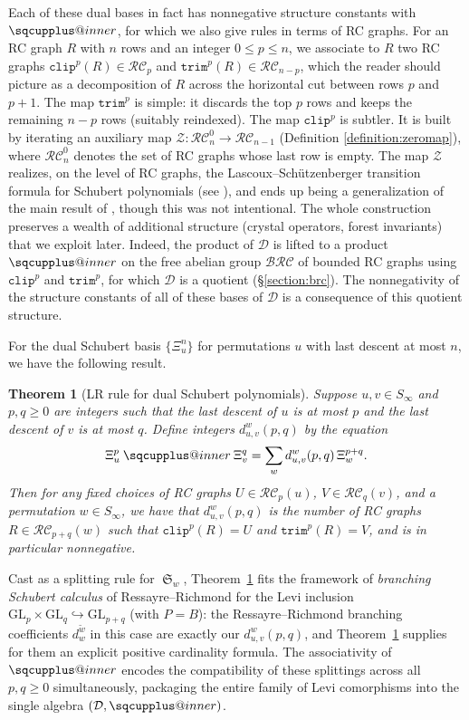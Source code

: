 \documentclass{amsart}
\makeatletter
\newcommand{\sqcupplus@inner}[2]{%
  \vcenter{\hbox{\ooalign{%
    \hfil$\m@th#1\sqcup$\hfil\cr
    \hfil\raisebox{0.15ex}{$\m@th#1\scriptscriptstyle+$}\hfil\cr
  }}}%
}
\newcommand{\sqcupplus}{\mathbin{\mathpalette\sqcupplus@inner\relax}}
\newtheorem{theorem}{Theorem}[section]
\theoremstyle{definition}
\theoremstyle{remark}
\numberwithin{equation}{subsection}
\DeclareMathOperator{\sch}{\mathfrak{S}}
\newcommand{\trm}{\mathtt{trim}}
\newcommand{\zeromap}{\mathcal{Z}}
\newcommand{\clp}{\mathtt{clip}}
\newcommand{\BRC}{\mathcal{BRC}}
\newcommand{\RC}{\mathcal{RC}}
\newcommand{\dsch}{\ensuremath{\Xi}}
\newcommand{\dcoma}{\mathcal{D}}
\makeatother
\begin{document}
Each of these dual bases in fact has nonnegative structure constants with $\sqcupplus$, for which we also give rules in terms of RC graphs. For an RC graph $R$ with $n$ rows and an integer $0\leq p\leq n$, we associate to $R$ two RC graphs $\clp^p(R)\in\RC_p$ and $\trm^p(R)\in\RC_{n-p}$, which the reader should picture as a decomposition of $R$ across the horizontal cut between rows $p$ and $p+1$. The map $\trm^p$ is simple: it discards the top $p$ rows and keeps the remaining $n-p$ rows (suitably reindexed). The map $\clp^p$ is subtler. It is built by iterating an auxiliary map $\zeromap:\RC_n^0\to\RC_{n-1}$ (Definition \ref{definition:zeromap}), where $\RC_n^0$ denotes the set of RC graphs whose last row is empty. The map $\zeromap$ realizes, on the level of RC graphs, the Lascoux--Schützenberger transition formula for Schubert polynomials (see \cite{notes}), and ends up being a generalization of the main result of \cite{little2003combinatorial}, though this was not intentional. The whole construction preserves a wealth of additional structure (crystal operators, forest invariants) that we exploit later. Indeed, the product of $\dcoma$ is lifted to a product $\sqcupplus$ on the free abelian group $\BRC$ of bounded RC graphs using $\clp^p$ and $\trm^p$, for which $\dcoma$ is a quotient (\S\ref{section:brc}). The nonnegativity of the structure constants of all of these bases of $\dcoma$ is a consequence of this quotient structure.

For the dual Schubert basis $\{\dsch_u^n\}$ for permutations $u$ with last descent at most $n$, we have the following result.

\begin{theorem}[LR rule for dual Schubert polynomials]\label{theorem:LR}
Suppose $u,v\in S_\infty$ and $p,q\geq 0$ are integers such that the last descent of $u$ is at most $p$ and the last descent of $v$ is at most $q$. Define integers $d_{u,v}^w(p, q)$ by the equation
$$\dsch_u^p \sqcupplus \dsch_v^q = \sum_{w} d_{u,v}^w(p, q)\,\dsch_w^{p+q}.$$
Then for any fixed choices of RC graphs $U\in \RC_p(u)$, $V\in\RC_q(v)$, and a permutation $w\in S_\infty$, we have that $d_{u, v}^w(p, q)$ is the number of RC graphs $R\in \RC_{p+q}(w)$ such that $\clp^p(R)=U$ and $\trm^p(R)=V$, and is in particular nonnegative.
\end{theorem}
Cast as a splitting rule for $\sch_w$, Theorem~\ref{theorem:LR} fits the framework of \emph{branching Schubert calculus} of Ressayre--Richmond \cite{ressayre2009branching} for the Levi inclusion $\mathrm{GL}_p\times \mathrm{GL}_q\hookrightarrow \mathrm{GL}_{p+q}$ (with $P=B$): the Ressayre--Richmond branching coefficients $d_w^{\tilde w}$ in this case are exactly our $d_{u,v}^w(p,q)$, and Theorem~\ref{theorem:LR} supplies for them an explicit positive cardinality formula. The associativity of $\sqcupplus$ encodes the compatibility of these splittings across all $p,q\geq 0$ simultaneously, packaging the entire family of Levi comorphisms into the single algebra $(\dcoma,\sqcupplus)$.
\end{document}
